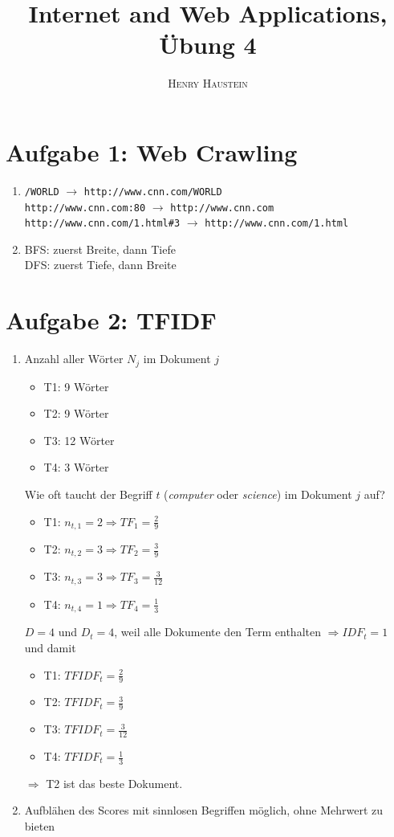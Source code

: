 \documentclass{article}
\title{\textbf{Internet and Web Applications, Übung 4}}
\author{\textsc{Henry Haustein}}
\date{}
\begin{document}
	\maketitle
	
	\section*{Aufgabe 1: Web Crawling}
	\begin{enumerate}[label=(\alph*)]
		\item \texttt{/WORLD} $\to$ \texttt{http://www.cnn.com/WORLD} \\
		\texttt{http://www.cnn.com:80} $\to$ \texttt{http://www.cnn.com} \\
		\texttt{http://www.cnn.com/1.html\#3} $\to$ \texttt{http://www.cnn.com/1.html}
		\item BFS: zuerst Breite, dann Tiefe \\
		DFS: zuerst Tiefe, dann Breite
	\end{enumerate}
	
	\section*{Aufgabe 2: TFIDF}
	\begin{enumerate}[label=(\alph*)]
		\item Anzahl aller Wörter $N_j$ im Dokument $j$
		\begin{itemize}
			\item T1: 9 Wörter
			\item T2: 9 Wörter
			\item T3: 12 Wörter
			\item T4: 3 Wörter
		\end{itemize}
		Wie oft taucht der Begriff $t$ (\textit{computer} oder \textit{science}) im Dokument $j$ auf?
		\begin{itemize}
			\item T1: $n_{t,1} = 2 \Rightarrow TF_1 = \frac{2}{9}$
			\item T2: $n_{t,2} = 3 \Rightarrow TF_2 = \frac{3}{9}$
			\item T3: $n_{t,3} = 3 \Rightarrow TF_3 = \frac{3}{12}$
			\item T4: $n_{t,4} = 1 \Rightarrow TF_4 = \frac{1}{3}$
		\end{itemize}
		$D=4$ und $D_t=4$, weil alle Dokumente den Term enthalten $\Rightarrow IDF_t = 1$ und damit
		\begin{itemize}
			\item T1: $TFIDF_t = \frac{2}{9}$
			\item T2: $TFIDF_t = \frac{3}{9}$
			\item T3: $TFIDF_t = \frac{3}{12}$
			\item T4: $TFIDF_t = \frac{1}{3}$
		\end{itemize}
		$\Rightarrow$ T2 ist das beste Dokument.
		\item Aufblähen des Scores mit sinnlosen Begriffen möglich, ohne Mehrwert zu bieten
	\end{enumerate}
	
\end{document}
